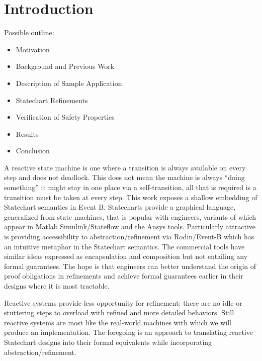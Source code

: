

\section{Introduction}

Possible outline:
\begin{itemize}
\item Motivation
\item Background and Previous Work
\item Description of Sample Application
\item Statechart Refinements
\item Verification of Safety Properties 
\item Results
\item Conclusion 
\end{itemize}

 A reactive state machine is one
where a transition is always available on every step and does not
deadlock.  This does not mean the machine is always ``doing
something'' it might stay in one place via a self-transition, all that
is required is a transition must be taken at every step.  This work
exposes a shallow embedding of Statechart\cite{} semantics in Event B.
Statecharts provide a graphical language, generalized from state
machines, that is popular with engineers, variants of which appear in
Matlab Simulink/Stateflow\cite{} and the Ansys tools.  Particularly
attractive is providing accessibility to abstraction/refinement via
Rodin/Event-B which has an intuitive metaphor in the Statechart
semantics\cite{prev-work}.  The commercial tools have similar ideas
expressed as encapsulation and composition but not entailing any
formal guarantees.  The hope is that engineers can better understand
the origin of proof obligations in refinements and achieve formal
guarantees earlier in their designs where it is most tractable.

Reactive systems provide less opportunity for refinement: there are no
idle or stuttering steps to overload with refined and more detailed
behaviors.  Still reactive systems are most like the real-world
machines with which we will produce an implementation.  The foregoing
is an approach to translating reactive Statechart designs into their
formal equivalents while incorporating abstraction/refinement.


